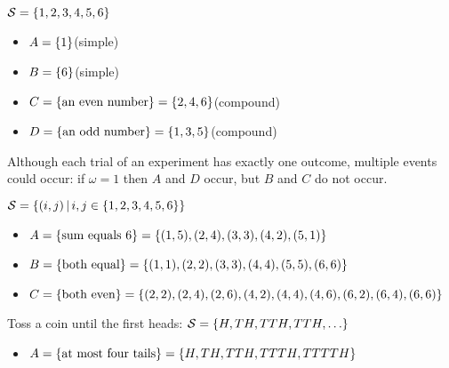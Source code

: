 \documentclass[letterpaper,12pt,fleqn]{article}
\newcommand{\w}{\omega}
\renewcommand{\S}{\mathcal{S}}
\begin{document}
\begin{example}
  \(\S=\set{1,2,3,4,5,6}\)
  \begin{itemize}
  \item \(A=\{1\}\)\qquad (simple)
  \item \(B=\{6\}\)\qquad (simple)
  \item \(C=\{\text{an even number}\}=\{2,4,6\}\)\qquad (compound)
  \item \(D=\{\text{an odd number}\}=\{1,3,5\}\)\qquad (compound)
  \end{itemize}
  Although each trial of an experiment has exactly one outcome, multiple events could occur: if \(\w=1\) then \(A\) and \(D\)
  occur, but \(B\) and \(C\) do not occur.
\end{example}

\begin{example}
  \(\S=\setb{(i,j)}{i,j\in\set{1,2,3,4,5,6}}\)
  \begin{itemize}
  \item \(A=\{\text{sum equals 6}\}=\{(1,5),(2,4),(3,3),(4,2),(5,1)\}\)
  \item \(B=\{\text{both equal}\}=\{(1,1),(2,2),(3,3),(4,4),(5,5),(6,6)\}\)
  \item \(C=\{\text{both even}\}=\{(2,2),(2,4),(2,6),(4,2),(4,4),(4,6),(6,2),(6,4),(6,6)\}\)
  \end{itemize}
\end{example}

\begin{example}
  Toss a coin until the first heads: \(\S=\set{H,TH,TTH,TTH,\ldots}\)
  \begin{itemize}
  \item \(A=\{\text{at most four tails}\}=\{H,TH,TTH,TTTH,TTTTH\}\)
  \end{itemize}
\end{example}
\end{document}
